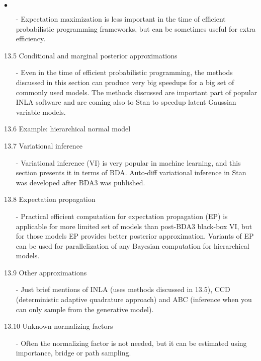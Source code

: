 \documentclass[a4paper,11pt,english]{article}
\begin{document}
\begin{list}{$\bullet$}{\parsep=0pt\itemsep=2pt}
  \begin{itemize}
  \item[-] Expectation maximization is less important in the time of
    efficient probabilistic programming frameworks, but can be
    sometimes useful for extra efficiency.
  \end{itemize}
\item[13.5] Conditional and marginal posterior approximations
  \begin{itemize}
  \item[-] Even in the time of efficient probabilistic programming, the
    methods discussed in this section can produce very big speedups
    for a big set of commonly used models. The methods discussed are
    important part of popular INLA software and are coming also to
    Stan to speedup latent Gaussian variable models.
  \end{itemize}
\item[13.6] Example: hierarchical normal model
\item[13.7] Variational inference
  \begin{itemize}
  \item[-] Variational inference (VI) is very popular in machine
    learning, and this section presents it in terms of BDA. Auto-diff
    variational inference in Stan was developed after BDA3 was
    published. 
  \end{itemize}
\item[13.8] Expectation propagation
  \begin{itemize}
  \item[-] Practical efficient computation for expectation propagation
    (EP) is applicable for more limited set of models than post-BDA3
    black-box VI, but for those models EP provides better posterior
    approximation. Variants of EP can be used for parallelization of
    any Bayesian computation for hierarchical models.
  \end{itemize}
\item[13.9] Other approximations
  \begin{itemize}
  \item[-] Just brief mentions of INLA (uses methods discussed in 13.5),
    CCD (deterministic adaptive quadrature approach) and ABC
    (inference when you can only sample from the generative model).
  \end{itemize}
\item[13.10] Unknown normalizing factors
  \begin{itemize}
  \item[-] Often the normalizing factor is not needed, but it can be
    estimated using importance, bridge or path sampling.
  \end{itemize}
\end{list}
\end{document}
